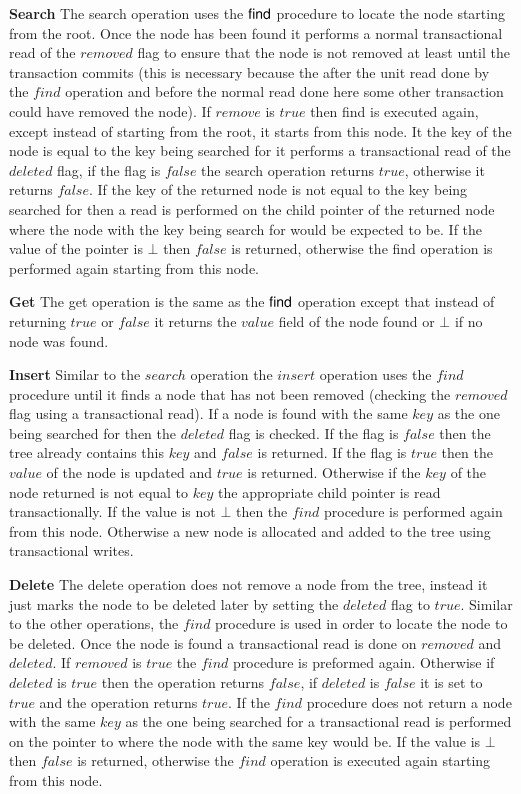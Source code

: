 \documentclass[10pt]{sigplanconf}
\begin{document}
{\bf Search} The search operation uses the ${\sf find}$ procedure to locate the node starting from the root.
Once the node has been found it performs a normal transactional read of the $removed$ flag to ensure that the node is not removed at least until the transaction commits (this is necessary because the after the unit read done by the $find$ operation and before the normal read done here some other transaction could have removed the node).
If $remove$ is $true$ then find is executed again, except instead of starting from the root, it starts from this node.
It the key of the node is equal to the key being searched for it performs a transactional read of the $deleted$ flag, if the flag is $false$ the search operation returns $true$, otherwise it returns $false$.
If the key of the returned node is not equal to the key being searched for then a read is performed on the child pointer of the returned node where the node with the key being search for would be expected to be.
If the value of the pointer is $\bot$ then $false$ is returned, otherwise the find operation is performed again starting from this node.

{\bf Get} The get operation is the same as the ${\sf find}$ operation except that instead of returning $true$ or $false$ it returns the $value$ field of the node found or $\bot$ if no node was found.

{\bf Insert} Similar to the $search$ operation the $insert$ operation uses the $find$ procedure until it finds a node that has not been removed (checking the $removed$ flag using a transactional read).
If a node is found with the same $key$ as the one being searched for then the $deleted$ flag is checked.
If the flag is $false$ then the tree already contains this $key$ and $false$ is returned.
If the flag is $true$ then the $value$ of the node is updated and $true$ is returned.
Otherwise if the $key$ of the node returned is not equal to $key$ the appropriate child pointer is read transactionally.
If the value is not $\bot$ then the $find$ procedure is performed again from this node.
Otherwise a new node is allocated and added to the tree using transactional writes.

{\bf Delete} The delete operation does not remove a node from the tree, instead it just marks the node to be deleted later by setting the $deleted$ flag to $true$.
Similar to the other operations, the $find$ procedure is used in order to locate the node to be deleted.
Once the node is found a transactional read is done on $removed$ and $deleted$.
If $removed$ is $true$ the $find$ procedure is preformed again.
Otherwise if $deleted$ is $true$ then the operation returns $false$, if $deleted$ is $false$ it is set to $true$ and the operation returns $true$.
If the $find$ procedure does not return a node with the same $key$ as the one being searched for a transactional read is performed on the pointer to where the node with the same key would be.
If the value is $\bot$ then $false$ is returned, otherwise the $find$ operation is executed again starting from this node.
\end{document}
